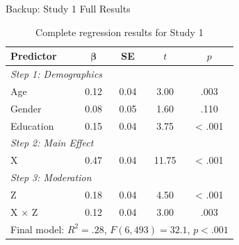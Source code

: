 \documentclass[aspectratio=169,12pt]{beamer}
\begin{document}

\appendix

\begin{frame}{Backup: Study 1 Full Results}
  \begin{table}
    \centering
    \caption{Complete regression results for Study 1}
    \footnotesize
    \begin{tabular}{lcccc}
      \toprule
      \textbf{Predictor} & $\boldsymbol{\beta}$ & \textbf{SE} & \textbf{$t$} & \textbf{$p$} \\
      \midrule
      \multicolumn{5}{l}{\textit{Step 1: Demographics}} \\
      Age & 0.12 & 0.04 & 3.00 & .003 \\
      Gender & 0.08 & 0.05 & 1.60 & .110 \\
      Education & 0.15 & 0.04 & 3.75 & < .001 \\
      \midrule
      \multicolumn{5}{l}{\textit{Step 2: Main Effect}} \\
      X & 0.47 & 0.04 & 11.75 & < .001 \\
      \midrule
      \multicolumn{5}{l}{\textit{Step 3: Moderation}} \\
      Z & 0.18 & 0.04 & 4.50 & < .001 \\
      X × Z & 0.12 & 0.04 & 3.00 & .003 \\
      \bottomrule
      \multicolumn{5}{l}{Final model: $R^2 = .28$, $F(6,493) = 32.1$, $p < .001$} \\
    \end{tabular}
  \end{table}
\end{frame}
\end{document}
